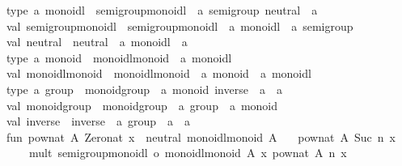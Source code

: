\begin{isabellebody}
\begin{isamarkuptext}
\isanewline
type\ {\isacharprime}a\ monoidl\ {\isacharequal}\ {\isacharbraceleft}semigroup{\isacharunderscore}monoidl\ {\isacharcolon}\ {\isacharprime}a\ semigroup{\isacharcomma}\ neutral\ {\isacharcolon}\ {\isacharprime}a{\isacharbraceright}{\isacharsemicolon}\isanewline
val\ semigroup{\isacharunderscore}monoidl\ {\isacharequal}\ {\isacharhash}semigroup{\isacharunderscore}monoidl\ {\isacharcolon}\ {\isacharprime}a\ monoidl\ {\isacharminus}{\isachargreater}\ {\isacharprime}a\ semigroup{\isacharsemicolon}\isanewline
val\ neutral\ {\isacharequal}\ {\isacharhash}neutral\ {\isacharcolon}\ {\isacharprime}a\ monoidl\ {\isacharminus}{\isachargreater}\ {\isacharprime}a{\isacharsemicolon}\isanewline
\isanewline
type\ {\isacharprime}a\ monoid\ {\isacharequal}\ {\isacharbraceleft}monoidl{\isacharunderscore}monoid\ {\isacharcolon}\ {\isacharprime}a\ monoidl{\isacharbraceright}{\isacharsemicolon}\isanewline
val\ monoidl{\isacharunderscore}monoid\ {\isacharequal}\ {\isacharhash}monoidl{\isacharunderscore}monoid\ {\isacharcolon}\ {\isacharprime}a\ monoid\ {\isacharminus}{\isachargreater}\ {\isacharprime}a\ monoidl{\isacharsemicolon}\isanewline
\isanewline
type\ {\isacharprime}a\ group\ {\isacharequal}\ {\isacharbraceleft}monoid{\isacharunderscore}group\ {\isacharcolon}\ {\isacharprime}a\ monoid{\isacharcomma}\ inverse\ {\isacharcolon}\ {\isacharprime}a\ {\isacharminus}{\isachargreater}\ {\isacharprime}a{\isacharbraceright}{\isacharsemicolon}\isanewline
val\ monoid{\isacharunderscore}group\ {\isacharequal}\ {\isacharhash}monoid{\isacharunderscore}group\ {\isacharcolon}\ {\isacharprime}a\ group\ {\isacharminus}{\isachargreater}\ {\isacharprime}a\ monoid{\isacharsemicolon}\isanewline
val\ inverse\ {\isacharequal}\ {\isacharhash}inverse\ {\isacharcolon}\ {\isacharprime}a\ group\ {\isacharminus}{\isachargreater}\ {\isacharprime}a\ {\isacharminus}{\isachargreater}\ {\isacharprime}a{\isacharsemicolon}\isanewline
\isanewline
fun\ pow{\isacharunderscore}nat\ A{\isacharunderscore}\ Zero{\isacharunderscore}nat\ x\ {\isacharequal}\ neutral\ {\isacharparenleft}monoidl{\isacharunderscore}monoid\ A{\isacharunderscore}{\isacharparenright}\isanewline
\ \ {\isacharbar}\ pow{\isacharunderscore}nat\ A{\isacharunderscore}\ {\isacharparenleft}Suc\ n{\isacharparenright}\ x\ {\isacharequal}\isanewline
\ \ \ \ mult\ {\isacharparenleft}{\isacharparenleft}semigroup{\isacharunderscore}monoidl\ o\ monoidl{\isacharunderscore}monoid{\isacharparenright}\ A{\isacharunderscore}{\isacharparenright}\ x\ {\isacharparenleft}pow{\isacharunderscore}nat\ A{\isacharunderscore}\ n\ x{\isacharparenright}{\isacharsemicolon}\isanewline

\end{isamarkuptext}
\end{isabellebody}
